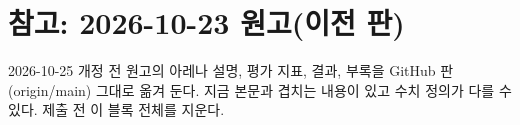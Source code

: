 \clearpage
\setcounter{secnumdepth}{0}
\section*{참고: 2026-10-23 원고(이전 판)}
2026-10-25 개정 전 원고의 아레나 설명, 평가 지표, 결과, 부록을 GitHub 판(origin/main) 그대로 옮겨 둔다. 지금 본문과 겹치는 내용이 있고 수치 정의가 다를 수 있다. 제출 전 이 블록 전체를 지운다.





